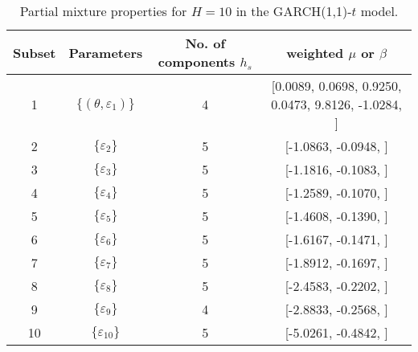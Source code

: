 \begin{table}[h] 
\centering 
\caption{Partial mixture properties for $H=10$ in the GARCH(1,1)-$t$ model.} 
\label{tab:pmits_t_garch2_noS} 
\begin{tabular}{cccc}  
 Subset & Parameters& No. of components $h_{s}$ & weighted $\mu$ or $\beta$  \\ \hline 
1 & $\{(\theta,\varepsilon_{1})\}$ & 4 & [0.0089, 0.0698, 0.9250, 0.0473, 9.8126, -1.0284, ]   \\ [1ex] 
2 & $\{\varepsilon_{2}\}$ & 5 & [-1.0863, -0.0948, ]   \\ [1ex] 
3 & $\{\varepsilon_{3}\}$ & 5 & [-1.1816, -0.1083, ]   \\ [1ex] 
4 & $\{\varepsilon_{4}\}$ & 5 & [-1.2589, -0.1070, ]   \\ [1ex] 
5 & $\{\varepsilon_{5}\}$ & 5 & [-1.4608, -0.1390, ]   \\ [1ex] 
6 & $\{\varepsilon_{6}\}$ & 5 & [-1.6167, -0.1471, ]   \\ [1ex] 
7 & $\{\varepsilon_{7}\}$ & 5 & [-1.8912, -0.1697, ]   \\ [1ex] 
8 & $\{\varepsilon_{8}\}$ & 5 & [-2.4583, -0.2202, ]   \\ [1ex] 
9 & $\{\varepsilon_{9}\}$ & 4 & [-2.8833, -0.2568, ]   \\ [1ex] 
10 & $\{\varepsilon_{10}\}$ & 5 & [-5.0261, -0.4842, ]   \\ [1ex] 
\hline 
\end{tabular} 
\end{table} 
